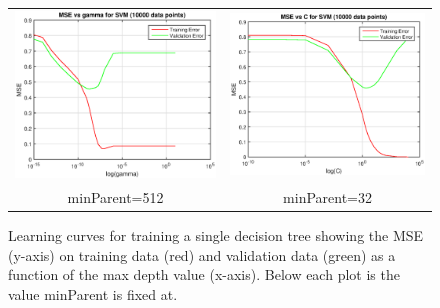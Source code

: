 \documentclass[12pt] {article}
\renewcommand{\baselinestretch}{1.3} %
\begin{document}
\renewcommand{\baselinestretch}{1.0} %
\begin{figure}[h!] \centering
\begin{tabular}{cc}
\includegraphics[width=.45\textwidth]{figdir/svmgamma10000.eps} &
\includegraphics[width=.45\textwidth]{figdir/svmc10000.eps} \\
minParent=512 & minParent=32 \\
\end{tabular}
\caption{Learning curves for training a single decision tree showing the MSE (y-axis) on training data (red) and validation data (green) as a function of the max depth value (x-axis). Below each plot is the value minParent is fixed at.}
\end{figure}
\renewcommand{\baselinestretch}{1.3} %
\end{document}
